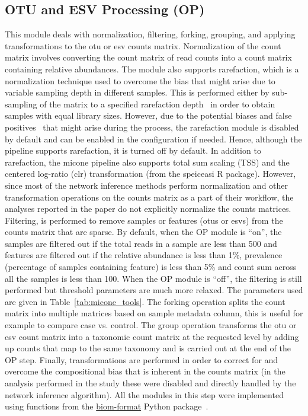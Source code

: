 \documentclass[letterpaper,12pt]{article}
\begin{document}
  \subsection*{OTU and ESV Processing (OP)}
  \vspace{-5mm}
  This module deals with normalization, filtering, forking, grouping, and applying transformations to the \ac{otu} or \ac{esv} counts matrix.
  Normalization of the count matrix involves converting the count matrix of read counts into a count matrix containing relative abundances.
  The module also supports rarefaction, which is a normalization technique used to overcome the bias that might arise due to variable sampling depth in different samples.
  This is performed either by sub-sampling of the matrix to a specified rarefaction depth~\cite{weissNormalizationMicrobialDifferential2017} in order to obtain samples with equal library sizes.
  However, due to the potential biases and false positives~\cite{mcmurdieWasteNotWant2014,chaoCoveragebasedRarefactionExtrapolation2012} that might arise during the process, the rarefaction module is disabled by default and can be enabled in the configuration if needed.
  Hence, although the pipeline supports rarefaction, it is turned off by default.
  In addition to rarefaction, the \ac{micone} pipeline also supports total sum scaling (TSS) and the centered log-ratio (clr) transformation (from the speiceasi R package).
  However, since most of the network inference methods perform normalization and other transformation operations on the counts matrix as a part of their workflow, the analyses reported in the paper do not explicitly normalize the counts matrices.
  Filtering, is performed to remove samples or features (\ac{otu}s or \ac{esv}s) from the counts matrix that are sparse.
  By default, when the OP module is ``on'', the samples are filtered out if the total reads in a sample are less than 500 and features are filtered out if the relative abundance is less than 1\%, prevalence (percentage of samples containing feature) is less than 5\% and count sum across all the samples is less than 100.
  When the OP module is ``off'', the filtering is still performed but threshold parameters are much more relaxed.
  The parameters used are given in Table~\ref{tab:micone_tools}.
  The forking operation splits the count matrix into multiple matrices based on sample metadata column, this is useful for example to compare case vs. control.
  The group operation transforms the \ac{otu} or \ac{esv} count matrix into a taxonomic count matrix at the requested level by adding up counts that map to the same taxonomy and is carried out at the end of the OP step.
  Finally, transformations are performed in order to correct for and overcome the compositional bias that is inherent in the counts matrix (in the analysis performed in the study these were disabled and directly handled by the network inference algorithm).
  All the modules in this step were implemented using functions from the \href{http://biom-format.org/}{biom-format} Python package~\cite{mcdonaldBiologicalObservationMatrix2012}.
\end{document}
